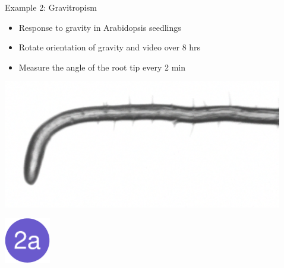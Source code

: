\documentclass[final,plain]{beamer}
\newlength{\sepwid}
\newlength{\onecolwid}
\newlength{\halfcolwid}
\newlength{\twocolwid}
\newcommand{\bi}{\begin{itemize}}
\newcommand{\ei}{\end{itemize}}
\begin{document}
\begin{frame}[t]
\begin{columns}[t]
\begin{column}{\twocolwid}
\begin{columns}[t]
\begin{column}{\onecolwid}
      \end{column}
  \end{columns}
  \end{column}

  \begin{column}{\sepwid} \end{column} %


  \begin{column}{\onecolwid}
    \begin{exampleblock}{\Large Example 2: Gravitropism}{
    \begin{minipage}[t]{\halfcolwid}
    \vspace*{0mm}

    \bi
    \item Response to gravity in Arabidopsis seedlings
    \item Rotate orientation of gravity and video over 8 hrs
    \item Measure the angle of the root tip every 2 min
    \ei

    \end{minipage}
    \hfill
    \begin{minipage}[t]{\halfcolwid}
    \vspace*{0mm}

    \includegraphics[width=\halfcolwid]{Figs/gravitropism.png}

    \end{minipage} }
    \end{exampleblock}


  \vspace{10mm} %

    \href{http://www.biostat.wisc.edu/~kbroman/posters/ENAR2014/2a}{\includegraphics[width=2cm]{Figs/dot2a.pdf}}


\end{column}
\end{columns}
\end{frame}
\end{document}
